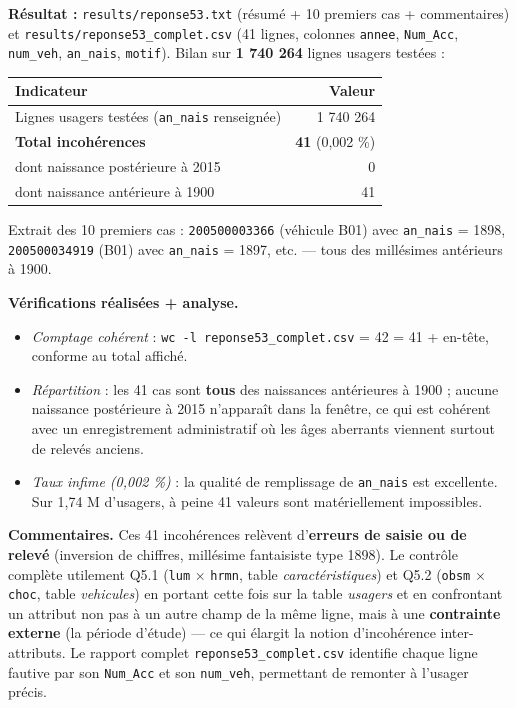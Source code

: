 \documentclass[11pt,a4paper]{article}
\newcommand{\rub}[2]{\textbf{\textcolor{#1}{#2}}}
\begin{document}
\rub{labresultat}{Résultat :} \texttt{results/reponse53.txt} (résumé + 10 premiers cas + commentaires) et \texttt{results/reponse53\_complet.csv} (41 lignes, colonnes \texttt{annee}, \texttt{Num\_Acc}, \texttt{num\_veh}, \texttt{an\_nais}, \texttt{motif}). Bilan sur \textbf{1 740 264} lignes usagers testées :

\begin{center}
\begin{tabular}{l r}
\hline
\textbf{Indicateur} & \textbf{Valeur} \\
\hline
Lignes usagers testées (\texttt{an\_nais} renseignée) & 1 740 264 \\
\textbf{Total incohérences} & \textbf{41} (0,002 \%) \\
dont naissance postérieure à 2015 & 0 \\
dont naissance antérieure à 1900 & 41 \\
\hline
\end{tabular}
\end{center}

Extrait des 10 premiers cas : \texttt{200500003366} (véhicule B01) avec \texttt{an\_nais} = 1898, \texttt{200500034919} (B01) avec \texttt{an\_nais} = 1897, etc. — tous des millésimes antérieurs à 1900.

\rub{labanalyse}{Vérifications réalisées + analyse.}

\begin{itemize}
\item \emph{Comptage cohérent} : \texttt{wc -l reponse53\_complet.csv} = 42 = 41 + en-tête, conforme au total affiché.
\item \emph{Répartition} : les 41 cas sont \textbf{tous} des naissances antérieures à 1900 ; aucune naissance postérieure à 2015 n'apparaît dans la fenêtre, ce qui est cohérent avec un enregistrement administratif où les âges aberrants viennent surtout de relevés anciens.
\item \emph{Taux infime (0,002 \%)} : la qualité de remplissage de \texttt{an\_nais} est excellente. Sur 1,74 M d'usagers, à peine 41 valeurs sont matériellement impossibles.
\end{itemize}

\rub{labcomment}{Commentaires.} Ces 41 incohérences relèvent d'\textbf{erreurs de saisie ou de relevé} (inversion de chiffres, millésime fantaisiste type 1898). Le contrôle complète utilement Q5.1 (\texttt{lum} × \texttt{hrmn}, table \emph{caractéristiques}) et Q5.2 (\texttt{obsm} × \texttt{choc}, table \emph{vehicules}) en portant cette fois sur la table \emph{usagers} et en confrontant un attribut non pas à un autre champ de la même ligne, mais à une \textbf{contrainte externe} (la période d'étude) — ce qui élargit la notion d'incohérence inter-attributs. Le rapport complet \texttt{reponse53\_complet.csv} identifie chaque ligne fautive par son \texttt{Num\_Acc} et son \texttt{num\_veh}, permettant de remonter à l'usager précis.
\clearpage
\end{document}
